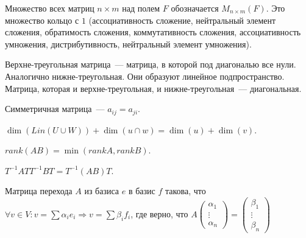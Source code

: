 \documentclass{article}
\begin{document}
	\begin{definition}
		 Множество всех матриц $n \times m$ над полем $F$ обозначается $M_{n \times m}(F)$. Это множество кольцо с $1$ (ассоциативность сложение, нейтральный элемент сложения, обратимость сложения, коммутативность сложения, ассоциативность умножения, дистрибутивность, нейтральный элемент умножения).
	\end{definition}
	\begin{definition}
		Верхне-треугольная матрица~--- матрица, в которой под диагональю все нули. Аналогично нижне-треугольная. Они образуют линейное подпространство. Матрица, которая и верхне-треугольная, и нижне-треугольная~--- диагональная.
	\end{definition}
	\begin{definition}
		Симметричная матрица~--- $a_{ij} = a_{ji}$.
	\end{definition}
	\begin{statement}
		$\dim(Lin(U \cup W)) + \dim(u \cap w) = \dim(u) + \dim(v)$.
	\end{statement}
	\begin{statement}
		$rank(AB) = \min(rank A, rank B)$.
	\end{statement}
	\begin{statement}
		$T^{-1} A T T^{-1} B T = T^{-1} (A B) T$.
	\end{statement}
	\begin{definition}
		Матрица перехода $A$ из базиса $e$ в базис $f$ такова, что $\forall v \in V: v = \sum \alpha_i e_i \Rightarrow v = \sum \beta_i f_i$, где верно, что $A
		\left( \begin{smallmatrix}
			\alpha_1 \\
			\vdots \\
			\alpha_n
		\end{smallmatrix} \right) =
		\left( \begin{smallmatrix}
			\beta_1 \\
			\vdots \\
			\beta_n
		\end{smallmatrix} \right)
		$
	\end{definition}
\end{document}
